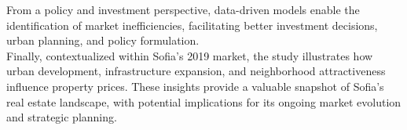 \documentclass[]{article}
\begin{document}
From a policy and investment perspective, data-driven models enable the identification of market inefficiencies, facilitating better investment decisions, urban planning, and policy formulation.\\


Finally, contextualized within Sofia’s 2019 market, the study illustrates how urban development, infrastructure expansion, and neighborhood attractiveness influence property prices. These insights provide a valuable snapshot of Sofia’s real estate landscape, with potential implications for its ongoing market evolution and strategic planning.\\


\printbibliography
\end{document}
